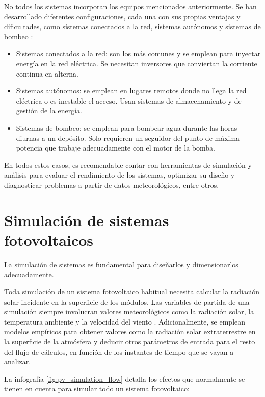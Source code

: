 No todos los sistemas incorporan los equipos mencionados anteriormente. Se han desarrollado diferentes configuraciones, cada una con sus propias ventajas y dificultades, como sistemas conectados a la red, \gls{sistemas autónomos} y \gls{sistemas de bombeo} \cite{Perpinan2020}:

\begin{itemize}
      \item Sistemas conectados a la red: son los más comunes y se emplean para inyectar energía en la red eléctrica. Se necesitan \gls{inversores} que conviertan la corriente continua en alterna.
      \item Sistemas autónomos: se emplean en lugares remotos donde no llega la red eléctrica o es inestable el acceso. Usan \gls{sistemas de almacenamiento} y de gestión de la energía.
      \item Sistemas de bombeo: se emplean para bombear agua durante las horas diurnas a un depósito. Solo requieren un seguidor del punto de máxima potencia que trabaje adecuadamente con el motor de la bomba.
\end{itemize}

En todos estos casos, es recomendable contar con herramientas de simulación y análisis para evaluar el rendimiento de los sistemas, optimizar su diseño y diagnosticar problemas a partir de datos meteorológicos, entre otros.

\section{Simulación de sistemas fotovoltaicos} \label{sct:simulaciones}

La \gls{simulación} de sistemas es fundamental para diseñarlos y dimensionarlos adecuadamente.

Toda simulación de un \gls{sistema fotovoltaico} habitual necesita calcular la radiación solar incidente en la superficie de los módulos. Las variables de partida de una simulación siempre involucran valores meteorológicos como la radiación solar, la temperatura ambiente y la velocidad del viento \cite{Perpinan2020}. Adicionalmente, se emplean modelos empíricos para obtener valores como la radiación solar extraterrestre en la superficie de la atmósfera y deducir otros parámetros de entrada para el resto del flujo de cálculos, en función de los instantes de tiempo que se vayan a analizar.

La infografía \ref{fig:pv_simulation_flow} detalla los efectos que normalmente se tienen en cuenta para simular todo un sistema fotovoltaico:

